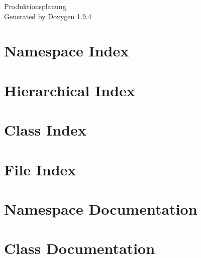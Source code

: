 \documentclass[twoside]{book}
\newcommand{\+}{\discretionary{\mbox{\scriptsize$\hookleftarrow$}}{}{}}
\newcommand{\clearemptydoublepage}{%
    \newpage{\pagestyle{empty}\cleardoublepage}%
  }
\begin{document}
  \raggedbottom
    \hypersetup{pageanchor=false,
                bookmarksnumbered=true,
                pdfencoding=unicode
               }
  \begin{titlepage}
  \vspace*{7cm}
  \begin{center}%
  {\Large Produktionsplanung}\\
  \vspace*{1cm}
  {\large Generated by Doxygen 1.9.4}\\
  \end{center}
  \end{titlepage}
  \clearemptydoublepage
  \tableofcontents
  \clearemptydoublepage
  \hypersetup{pageanchor=true}
\chapter{Namespace Index}

\chapter{Hierarchical Index}

\chapter{Class Index}

\chapter{File Index}

\chapter{Namespace Documentation}


\chapter{Class Documentation}


















\end{document}
